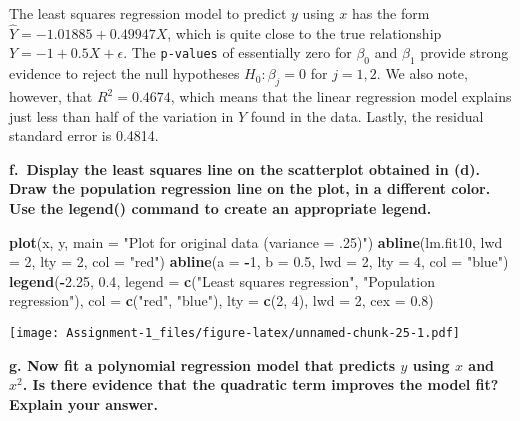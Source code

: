 \documentclass[
]{article}
\newenvironment{Shaded}{\begin{snugshade}}{\end{snugshade}}
\newcommand{\AttributeTok}[1]{\textcolor[rgb]{0.13,0.29,0.53}{#1}}
\newcommand{\DecValTok}[1]{\textcolor[rgb]{0.00,0.00,0.81}{#1}}
\newcommand{\FloatTok}[1]{\textcolor[rgb]{0.00,0.00,0.81}{#1}}
\newcommand{\FunctionTok}[1]{\textcolor[rgb]{0.13,0.29,0.53}{\textbf{#1}}}
\newcommand{\NormalTok}[1]{#1}
\newcommand{\SpecialCharTok}[1]{\textcolor[rgb]{0.81,0.36,0.00}{\textbf{#1}}}
\newcommand{\StringTok}[1]{\textcolor[rgb]{0.31,0.60,0.02}{#1}}
\begin{document}
The least squares regression model to predict \(y\) using \(x\) has the
form \(\hat{Y}=-1.01885+0.49947 X\), which is quite close to the true
relationship \(Y=-1+0.5X+\epsilon\). The \texttt{p-values} of
essentially zero for \(\beta_0\) and \(\beta_1\) provide strong evidence
to reject the null hypotheses \(H_0: \beta_j=0\) for \(j=1,2\). We also
note, however, that \(R^2=0.4674\), which means that the linear
regression model explains just less than half of the variation in \(Y\)
found in the data. Lastly, the residual standard error is 0.4814.

\textbf{f.~Display the least squares line on the scatterplot obtained in
(d). Draw the population regression line on the plot, in a different
color. Use the legend() command to create an appropriate legend.}

\begin{Shaded}
\begin{Highlighting}[]
\FunctionTok{plot}\NormalTok{(x, y, }\AttributeTok{main =} \StringTok{"Plot for original data (variance = .25)"}\NormalTok{)}
\FunctionTok{abline}\NormalTok{(lm.fit10, }\AttributeTok{lwd =} \DecValTok{2}\NormalTok{, }\AttributeTok{lty =} \DecValTok{2}\NormalTok{, }\AttributeTok{col =} \StringTok{"red"}\NormalTok{)}
\FunctionTok{abline}\NormalTok{(}\AttributeTok{a =} \SpecialCharTok{{-}}\DecValTok{1}\NormalTok{, }\AttributeTok{b =} \FloatTok{0.5}\NormalTok{, }\AttributeTok{lwd =} \DecValTok{2}\NormalTok{, }\AttributeTok{lty =} \DecValTok{4}\NormalTok{, }\AttributeTok{col =} \StringTok{"blue"}\NormalTok{)}
\FunctionTok{legend}\NormalTok{(}\SpecialCharTok{{-}}\FloatTok{2.25}\NormalTok{, }\FloatTok{0.4}\NormalTok{, }\AttributeTok{legend =} \FunctionTok{c}\NormalTok{(}\StringTok{"Least squares regression"}\NormalTok{, }\StringTok{"Population regression"}\NormalTok{), }\AttributeTok{col =} \FunctionTok{c}\NormalTok{(}\StringTok{"red"}\NormalTok{, }\StringTok{"blue"}\NormalTok{), }
       \AttributeTok{lty =} \FunctionTok{c}\NormalTok{(}\DecValTok{2}\NormalTok{, }\DecValTok{4}\NormalTok{), }\AttributeTok{lwd =} \DecValTok{2}\NormalTok{, }\AttributeTok{cex =} \FloatTok{0.8}\NormalTok{)}
\end{Highlighting}
\end{Shaded}

\texttt{[image: Assignment-1\_files/figure-latex/unnamed-chunk-25-1.pdf]}

\textbf{g. Now fit a polynomial regression model that predicts \(y\)
using \(x\) and \(x^{2}\). Is there evidence that the quadratic term
improves the model fit? Explain your answer.}
\end{document}
